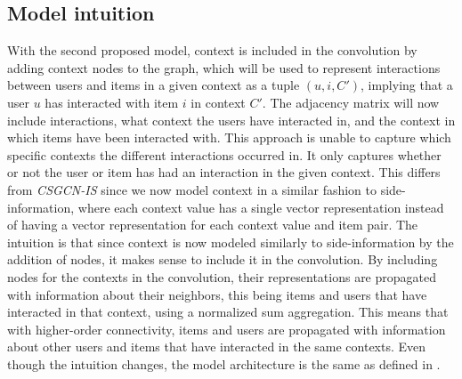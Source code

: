 \subsection{Model intuition}\label{subsec:csgcn_adj_intuition}
With the second proposed model, context is included in the convolution by adding context nodes to the graph, which will be used to represent interactions between users and items in a given context as a tuple $(u,i,C')$, implying that a user $u$ has interacted with item $i$ in context $C'$.
The adjacency matrix will now include interactions, what context the users have interacted in, and the context in which items have been interacted with.
This approach is unable to capture which specific contexts the different interactions occurred in.
It only captures whether or not the user or item has had an interaction in the given context.
This differs from \textit{CSGCN-IS} since we now model context in a similar fashion to side-information, where each context value has a single vector representation instead of having a vector representation for each context value and item pair.
The intuition is that since context is now modeled similarly to side-information by the addition of nodes, it makes sense to include it in the convolution.
By including nodes for the contexts in the convolution, their representations are propagated with information about their neighbors, this being items and users that have interacted in that context, using a normalized sum aggregation.
This means that with higher-order connectivity, items and users are propagated with information about other users and items that have interacted in the same contexts.
Even though the intuition changes, the model architecture is the same as defined in .

